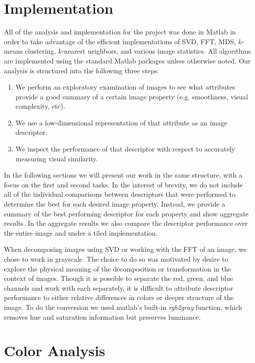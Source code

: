 \documentclass{report}
\begin{document}
\section{Implementation}
All of the analysis and implementation for the project was done in Matlab in order to take advantage of the efficient implementations of SVD, FFT, MDS, $k$-means clustering, $k$-nearest neighbors, and various image statistics. All algorithms are implemented using the standard Matlab packages unless otherwise noted. Our analysis is structured into the following three steps:
\begin{enumerate}
  \item We perform an exploratory examination of images to see what attributes provide a good summary of a certain image property (e.g. smoothness, visual complexity, etc).
  \item We use a low-dimensional representation of that attribute as an image descriptor.
  \item We inspect the performance of that descriptor with respect to accurately measuring visual similarity.
\end{enumerate}
In the following sections we will present our work in the same structure, with a focus on the first and second tasks. In the interest of brevity, we do not include all of the individual comparisons between descriptors that were performed to determine the best for each desired image property. Instead, we provide a summary of the best performing descriptor for each property and show aggregate results. In the aggregate results we also compare the descriptor performance over the entire image and under a tiled implementation.

When decomposing images using SVD or working with the FFT of an image, we chose to work in grayscale. The choice to do so was motivated by desire to explore the physical meaning of the decomposition or transformation in the context of images. Though it is possible to separate the red, green, and blue channels and work with each separately, it is difficult to attribute descriptor performance to either relative differences in colors or deeper structure of the image. To do the conversion we used matlab's built-in \textit{rgb2gray} function, which removes hue and saturation information but preserves luminance.

\section{Color Analysis}
\label{sec:color}
\end{document}
